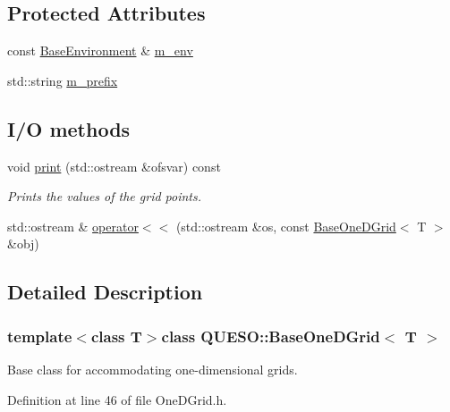 \subsection*{Protected Attributes}
\begin{DoxyCompactItemize}
\item 
const \hyperlink{class_q_u_e_s_o_1_1_base_environment}{Base\-Environment} \& \hyperlink{class_q_u_e_s_o_1_1_base_one_d_grid_a668a0033829b907fac9e13466419b7b1}{m\-\_\-env}
\item 
std\-::string \hyperlink{class_q_u_e_s_o_1_1_base_one_d_grid_af5fa59e47fae9f6195b00e5bec8310f8}{m\-\_\-prefix}
\end{DoxyCompactItemize}
\subsection*{I/\-O methods}
\begin{DoxyCompactItemize}
\item 
void \hyperlink{class_q_u_e_s_o_1_1_base_one_d_grid_af72394608d602022a6cff06018a5df22}{print} (std\-::ostream \&ofsvar) const 
\begin{DoxyCompactList}\small\item\em Prints the values of the grid points. \end{DoxyCompactList}\item 
std\-::ostream \& \hyperlink{class_q_u_e_s_o_1_1_base_one_d_grid_a00cca8cd319438b0e49d9ebc72a1749d}{operator$<$$<$} (std\-::ostream \&os, const \hyperlink{class_q_u_e_s_o_1_1_base_one_d_grid}{Base\-One\-D\-Grid}$<$ T $>$ \&obj)
\end{DoxyCompactItemize}


\subsection{Detailed Description}
\subsubsection*{template$<$class T$>$class Q\-U\-E\-S\-O\-::\-Base\-One\-D\-Grid$<$ T $>$}

Base class for accommodating one-\/dimensional grids. 

Definition at line 46 of file One\-D\-Grid.\-h.



